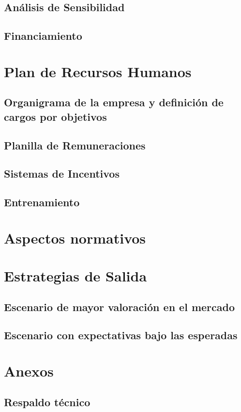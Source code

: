 \documentclass[letterpaper,12pt]{article}
\begin{document}
	\subsection{Análisis de Sensibilidad}
	\subsection{Financiamiento}
\newpage
\section{Plan de Recursos Humanos}
	\subsection{Organigrama de la empresa y definición de cargos por objetivos}
	\subsection{Planilla de Remuneraciones}
	\subsection{Sistemas de Incentivos}
	\subsection{Entrenamiento}
\newpage
\section{Aspectos normativos}
\newpage
\section{Estrategias de Salida}
	\subsection{Escenario de mayor valoración en el mercado}
	\subsection{Escenario con expectativas bajo las esperadas}
\newpage
\section{Anexos}
	\subsection{Respaldo técnico}
\end{document}
